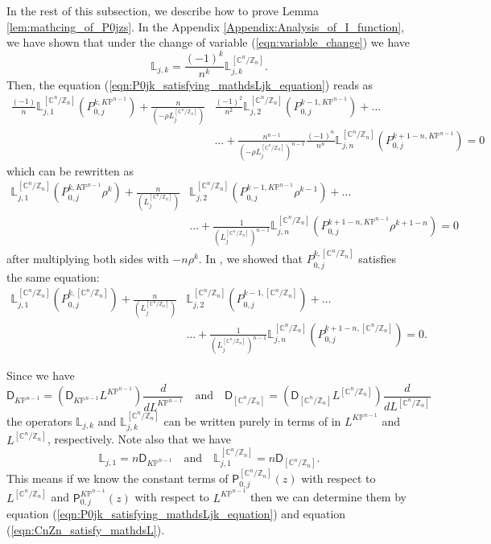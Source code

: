 \documentclass[12pt]{amsart}
\numberwithin{equation}{section}
\newcommand{\CnZn}{[\mathbb{C}^n/\mathbb{Z}_n]}
\newcommand{\KP}{K\mathbb{P}}
\begin{document}
In the rest of this subsection, we describe how to prove Lemma \ref{lem:mathcing_of_P0jzs}. In the Appendix \ref{Appendix:Analysis_of_I_function}, we have shown that under the change of variable (\ref{eqn:variable_change}) we have
\begin{equation*}
\mathds{L}_{j,k}=\frac{(-1)^k}{n^k}\mathds{L}_{j,k}^{\CnZn}.
\end{equation*}
Then, the equation (\ref{eqn:P0jk_satisfying_mathdsLjk_equation}) reads as
\begin{equation*}
\begin{aligned}
\frac{(-1)}{n}\mathds{L}^{\CnZn}_{j,1}(P_{0,j}^{k,\KP^{n-1}})
+\frac{n}{(-\rho L_j^{\CnZn})}&\frac{(-1)^2}{n^2}\mathds{L}^{\CnZn}_{j,2}(P_{0,j}^{k-1,\KP^{n-1}})
+\ldots \\ &\ldots
+\frac{n^{n-1}}{(-\rho L_j^{\CnZn})^{n-1}}\frac{(-1)^n}{n^n}\mathds{L}^{\CnZn}_{j,n}(P_{0,j}^{k+1-n,\KP^{n-1}})=0
\end{aligned}
\end{equation*}
which can be rewritten as
\begin{equation}\label{eqn:P0jk_satisfy_mathdsL_for_CnZn_after_identification}
\begin{aligned}
\mathds{L}^{\CnZn}_{j,1}(P_{0,j}^{k,\KP^{n-1}}\rho^k)
+\frac{n}{( L_j^{\CnZn})}&\mathds{L}^{\CnZn}_{j,2}(P_{0,j}^{k-1,\KP^{n-1}}\rho^{k-1})
+\ldots \\ &\ldots
+\frac{1}{( L_j^{\CnZn})^{n-1}}\mathds{L}^{\CnZn}_{j,n}(P_{0,j}^{k+1-n,\KP^{n-1}}\rho^{k+1-n})=0    
\end{aligned}
\end{equation}
after multiplying both sides with $-n\rho^k$. In \cite[Corollary 1.16]{gt}, we showed that $P_{0,j}^{k,\CnZn}$ satisfies the same equation:
\begin{equation}\label{eqn:CnZn_satisfy_mathdsL}
\begin{aligned}
\mathds{L}^{\CnZn}_{j,1}(P_{0,j}^{k,\CnZn})
+\frac{n}{( L_j^{\CnZn})}&\mathds{L}^{\CnZn}_{j,2}(P_{0,j}^{k-1,\CnZn})
+\ldots\\ &\ldots
+\frac{1}{( L_j^{\CnZn})^{n-1}}\mathds{L}^{\CnZn}_{j,n}(P_{0,j}^{k+1-n,\CnZn})=0.
\end{aligned}
\end{equation}

Since we have
\begin{equation*}
\mathsf{D}_{\KP^{n-1}}=(\mathsf{D}_{\KP^{n-1}}L^{\KP^{n-1}})\frac{d}{dL^{\KP^{n-1}}} \quad \text{and} \quad \mathsf{D}_{\CnZn}=(\mathsf{D}_{\CnZn}L^{\CnZn})\frac{d}{dL^{\CnZn}}
\end{equation*}
the operators $\mathds{L}_{j,k}$ and $\mathds{L}_{j,k}^{\CnZn}$ can be written purely in terms of in $L^{\KP^{n-1}}$ and $L^{\CnZn}$, respectively. Note also that we have
\begin{equation*}
\mathds{L}_{j,1}=n\mathsf{D}_{\KP^{n-1}} \quad \text{and} \quad
\mathds{L}^{\CnZn}_{j,1}=n\mathsf{D}_{\CnZn}.
\end{equation*}
This means if we know the constant terms of $\mathsf{P}^{\CnZn}_{0,j}(z)$ with respect to $L^{\CnZn}$ and $\mathsf{P}^{\KP^{n-1}}_{0,j}(z)$  with respect to $L^{\KP^{n-1}}$ then we can determine them by equation (\ref{eqn:P0jk_satisfying_mathdsLjk_equation}) and equation (\ref{eqn:CnZn_satisfy_mathdsL}).
\end{document}
